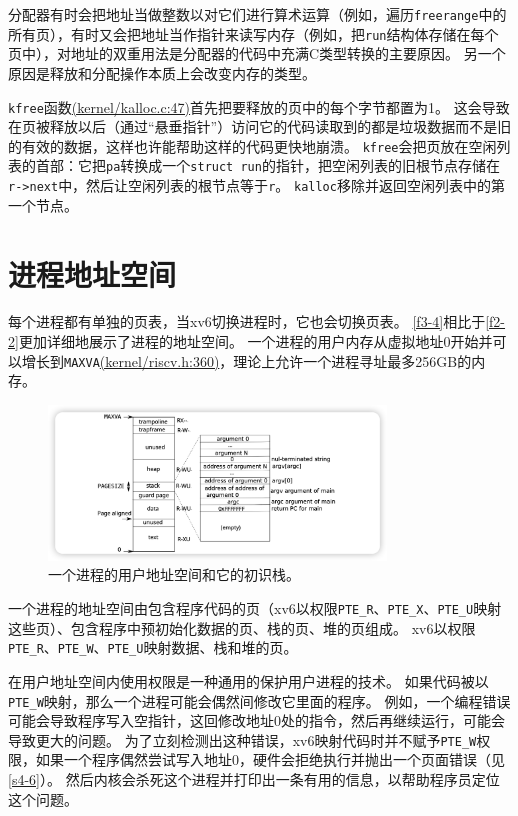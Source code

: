 分配器有时会把地址当做整数以对它们进行算术运算（例如，遍历\texttt{freerange}中的所有页），有时又会把地址当作指针来读写内存（例如，把\texttt{run}结构体存储在每个页中），对地址的双重用法是分配器的代码中充满C类型转换的主要原因。
另一个原因是释放和分配操作本质上会改变内存的类型。

\texttt{kfree}函数\href{https://github.com/mit-pdos/xv6-riscv/blob/riscv/kernel/kalloc.c#L47}{(kernel/kalloc.c:47)}首先把要释放的页中的每个字节都置为1。
这会导致在页被释放以后（通过“悬垂指针”）访问它的代码读取到的都是垃圾数据而不是旧的有效的数据，这样也许能帮助这样的代码更快地崩溃。
\texttt{kfree}会把页放在空闲列表的首部：它把\texttt{pa}转换成一个\texttt{struct run}的指针，把空闲列表的旧根节点存储在\texttt{r->next}中，然后让空闲列表的根节点等于\texttt{r}。
\texttt{kalloc}移除并返回空闲列表中的第一个节点。

\section{进程地址空间}
每个进程都有单独的页表，当xv6切换进程时，它也会切换页表。
\autoref{f3-4}相比于\autoref{f2-2}更加详细地展示了进程的地址空间。
一个进程的用户内存从虚拟地址0开始并可以增长到\texttt{MAXVA}\href{https://github.com/mit-pdos/xv6-riscv/blob/riscv/kernel/riscv.h#L360}{(kernel/riscv.h:360)}，理论上允许一个进程寻址最多256GB的内存。

\begin{figure}[htbp]
    \centering
    \includegraphics[width=0.8\textwidth]{../imgs/f3-4.png}
    \caption{一个进程的用户地址空间和它的初识栈。}
    \label{f3-4}
\end{figure}

一个进程的地址空间由包含程序代码的页（xv6以权限\texttt{PTE\_R}、\texttt{PTE\_X}、\texttt{PTE\_U}映射这些页）、包含程序中预初始化数据的页、栈的页、堆的页组成。
xv6以权限\texttt{PTE\_R}、\texttt{PTE\_W}、\texttt{PTE\_U}映射数据、栈和堆的页。

在用户地址空间内使用权限是一种通用的保护用户进程的技术。
如果代码被以\texttt{PTE\_W}映射，那么一个进程可能会偶然间修改它里面的程序。
例如，一个编程错误可能会导致程序写入空指针，这回修改地址0处的指令，然后再继续运行，可能会导致更大的问题。
为了立刻检测出这种错误，xv6映射代码时并不赋予\texttt{PTE\_W}权限，如果一个程序偶然尝试写入地址0，硬件会拒绝执行并抛出一个页面错误（见\autoref{s4-6}）。
然后内核会杀死这个进程并打印出一条有用的信息，以帮助程序员定位这个问题。

